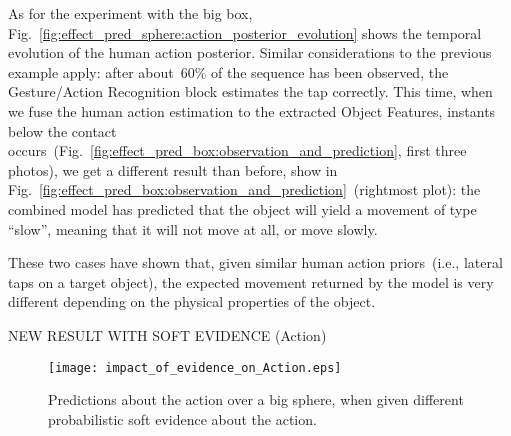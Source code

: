 \begin{figure*}
    \centering


    \caption{Object velocity predictions on a big box, given probabilistic human action information from Gesture \acp{HMM}.}
    \label{fig:effect_pred_box}
\end{figure*}

As for the experiment with the big box, Fig.~\ref{fig:effect_pred_sphere:action_posterior_evolution} shows the temporal evolution of the human action posterior.
Similar considerations to the previous example apply: after about~$60$\% of the sequence has been observed, the Gesture/Action Recognition block estimates the tap correctly.
This time, when we fuse the human action estimation to the extracted Object Features, instants below the contact occurs~(Fig.~\ref{fig:effect_pred_box:observation_and_prediction}, first three photos), we get a different result than before, show in Fig.~\ref{fig:effect_pred_box:observation_and_prediction}~(rightmost plot): the combined model has predicted that the object will yield a movement of type ``slow'', meaning that it will not move at all, or move slowly.

These two cases have shown that, given similar human action priors~(i.e., lateral taps on a target object), the expected movement returned by the model is very different depending on the physical properties of the object.



NEW RESULT WITH SOFT EVIDENCE (Action)

\begin{figure}
\centering
\texttt{[image: impact\_of\_evidence\_on\_Action.eps]}
\caption{Predictions about the action over a big sphere, when given different probabilistic soft evidence about the action.}
\label{fig:impact_of_evidence_on_Action}
\end{figure}

